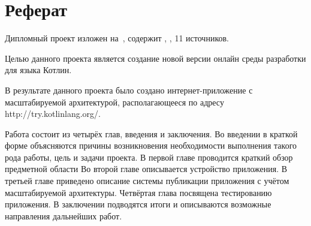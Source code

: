 \chapter*{Реферат}

	Дипломный проект изложен на~, содержит , , 11 источников.

	Целью данного проекта является создание новой версии онлайн среды разработки для языка Котлин.

	В результате данного проекта было создано интернет-приложение с масштабируемой архитектурой, располагающееся по адресу\\ http://try.kotlinlang.org/. 
	
	Работа состоит из четырёх глав, введения и заключения.
Во введении в краткой форме объясняются причины возникновения необходимости выполнения такого рода работы, цель и задачи проекта.
В первой главе проводится краткий обзор предметной области
Во второй главе описывается устройство приложения.
В третьей главе приведено описание системы публикации приложения с учётом масштабируемой архитектуры.
Четвёртая глава посвящена тестированию приложения.
В заключении подводятся итоги и описываются возможные направления дальнейших работ.

\clearpage
